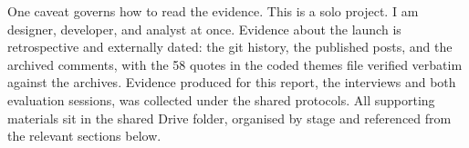 One caveat governs how to read the evidence. This is a solo project. I am designer, developer, and analyst at once. Evidence about the launch is retrospective and externally dated: the git history, the published posts, and the archived comments, with the 58 quotes in the coded themes file verified verbatim against the archives. Evidence produced for this report, the interviews and both evaluation sessions, was collected under the shared protocols. All supporting materials sit in the shared Drive folder, organised by stage and referenced from the relevant sections below.
